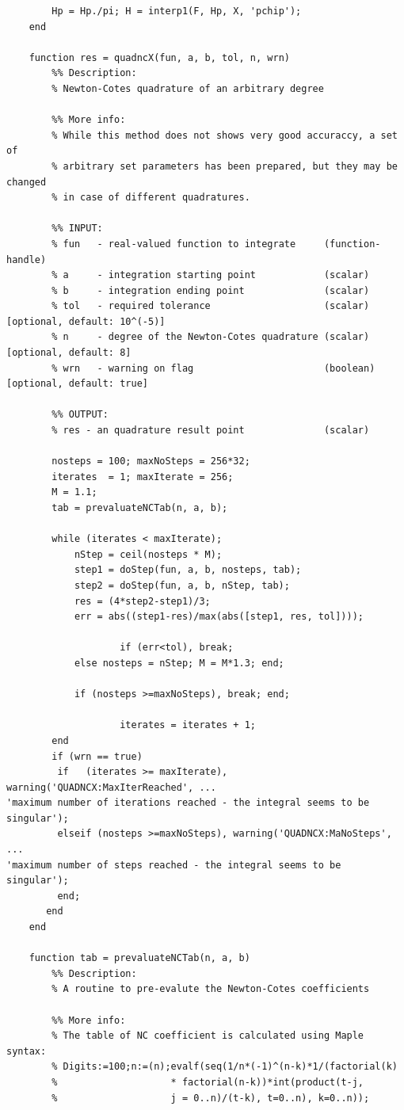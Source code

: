 \documentclass[12pt,twoside,a4paper]{article}
\numberwithin{equation}{subsection}
\numberwithin{figure}{subsection}
\begin{document}
\begin{lstlisting}
	    Hp = Hp./pi; H = interp1(F, Hp, X, 'pchip');
	end
	
	function res = quadncX(fun, a, b, tol, n, wrn)
	    %% Description:
	    % Newton-Cotes quadrature of an arbitrary degree
	
	    %% More info:
	    % While this method does not shows very good accuraccy, a set of
	    % arbitrary set parameters has been prepared, but they may be changed
	    % in case of different quadratures.
	    
	    %% INPUT:
	    % fun   - real-valued function to integrate     (function-handle)
	    % a     - integration starting point            (scalar)
	    % b     - integration ending point              (scalar)
	    % tol   - required tolerance                    (scalar)  [optional, default: 10^(-5)]
	    % n     - degree of the Newton-Cotes quadrature (scalar)  [optional, default: 8]
	    % wrn   - warning on flag                       (boolean) [optional, default: true]
	    
	    %% OUTPUT:
	    % res - an quadrature result point              (scalar)
	    
	    nosteps = 100; maxNoSteps = 256*32;
	    iterates  = 1; maxIterate = 256;
	    M = 1.1;
	    tab = prevaluateNCTab(n, a, b);
	    
	    while (iterates < maxIterate);
	        nStep = ceil(nosteps * M);
	        step1 = doStep(fun, a, b, nosteps, tab);
	        step2 = doStep(fun, a, b, nStep, tab);
	        res = (4*step2-step1)/3; 
	        err = abs((step1-res)/max(abs([step1, res, tol])));
	        
					if (err<tol), break;
	        else nosteps = nStep; M = M*1.3; end;
					
	        if (nosteps >=maxNoSteps), break; end;
	        
					iterates = iterates + 1;
	    end
	    if (wrn == true)
	     if   (iterates >= maxIterate), warning('QUADNCX:MaxIterReached', ...
'maximum number of iterations reached - the integral seems to be singular'); 
		 elseif (nosteps >=maxNoSteps), warning('QUADNCX:MaNoSteps', ...
'maximum number of steps reached - the integral seems to be singular');  
         end; 
       end
	end
	
	function tab = prevaluateNCTab(n, a, b)
	    %% Description:
	    % A routine to pre-evalute the Newton-Cotes coefficients
	
	    %% More info:
	    % The table of NC coefficient is calculated using Maple syntax:
	    % Digits:=100;n:=(n);evalf(seq(1/n*(-1)^(n-k)*1/(factorial(k)
	    %                    * factorial(n-k))*int(product(t-j, 
	    %                    j = 0..n)/(t-k), t=0..n), k=0..n));
	    

\end{lstlisting}
\end{document}
